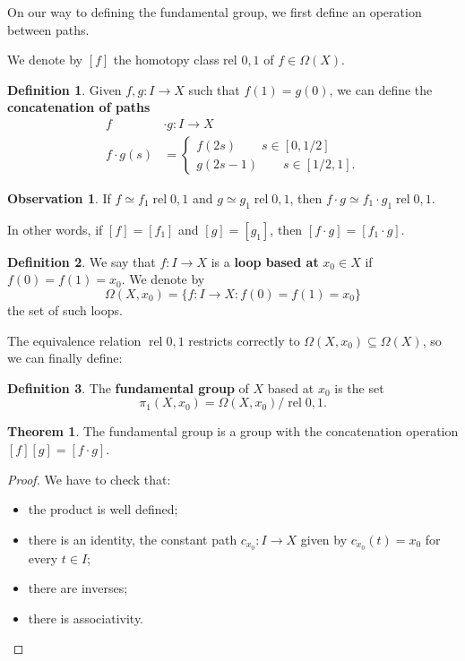 \documentclass{book}
\theoremstyle{definition}
\newtheorem*{defn}{Definition}
\newtheorem*{obs}{Observation}
\newtheorem*{teo}{Theorem}
\DeclareMathOperator{\rel}{rel}
\begin{document}
On our way to defining the fundamental group, we first
define an operation between paths.

We denote by $[f]$ the homotopy class rel $0,1$ of
$f\in\Omega(X)$.

\begin{defn}
Given $f,g:I\to X$ such that $f(1)=g(0)$, we can define
the \textbf{concatenation of paths}
$$
\begin{aligned}
f&\cdot g:I\to X\\
f\cdot g(s)&=\begin{cases}
f(2s)\qquad s\in[0,1/2]\\
g(2s-1)\qquad s\in[1/2,1].
\end{cases}
\end{aligned}
$$
\end{defn}

\begin{obs}
If $f\simeq f_1\rel0,1$ and $g\simeq g_1\rel0,1$, then
$f\cdot g\simeq f_1\cdot g_1\rel0,1$.

In other words, if $[f]=[f_1]$ and $[g]=[g_1]$, then
$[f\cdot g]=[f_1\cdot g]$.
\end{obs}

\begin{defn}
We say that $f:I\to X$ is a \textbf{loop based at}
$x_0\in X$ if $f(0)=f(1)=x_0$. We denote by
$$
\Omega(X,x_0)=\{f:I\to X:f(0)=f(1)=x_0\}
$$
the set of such loops.
\end{defn}

The equivalence relation $\rel0,1$ restricts correctly to
$\Omega(X,x_0)\subseteq\Omega(X)$, so we can finally define:

\begin{defn}
The \textbf{fundamental group} of $X$ based at $x_0$ is the
set
$$
\pi_1(X,x_0)=\Omega(X,x_0)/\rel0,1.
$$
\end{defn}

\begin{teo}
The fundamental group is a group with the concatenation
operation $[f][g]=[f\cdot g]$.
\end{teo}

\begin{proof}
We have to check that:
\begin{itemize}
\item the product is well defined;
\item there is an identity, the constant path
$c_{x_0}:I\to X$ given by $c_{x_0}(t)=x_0$ for every
$t\in I$;
\item there are inverses;
\item there is associativity.
\end{itemize}
\end{proof}
\end{document}
